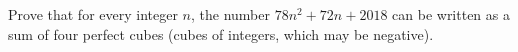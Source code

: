 Prove that for every integer $n$, the number $78n^2+72n+2018$ can be written as a sum of four perfect cubes (cubes of integers, which may be negative).
